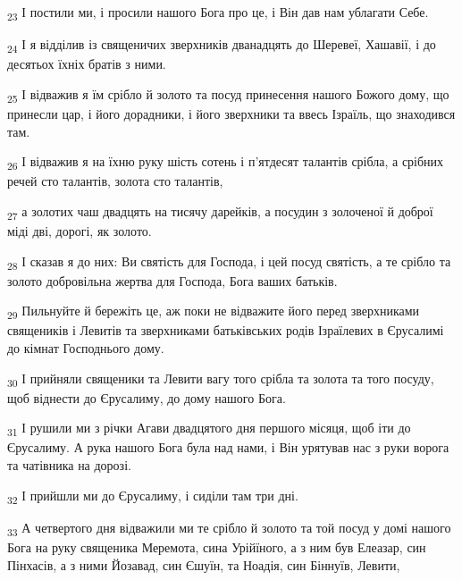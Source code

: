 \begin{tcolorbox}
\textsubscript{23} І постили ми, і просили нашого Бога про це, і Він дав нам ублагати Себе.
\end{tcolorbox}
\begin{tcolorbox}
\textsubscript{24} І я відділив із священичих зверхників дванадцять до Шеревеї, Хашавії, і до десятьох їхніх братів з ними.
\end{tcolorbox}
\begin{tcolorbox}
\textsubscript{25} І відважив я їм срібло й золото та посуд принесення нашого Божого дому, що принесли цар, і його дорадники, і його зверхники та ввесь Ізраїль, що знаходився там.
\end{tcolorbox}
\begin{tcolorbox}
\textsubscript{26} І відважив я на їхню руку шість сотень і п'ятдесят талантів срібла, а срібних речей сто талантів, золота сто талантів,
\end{tcolorbox}
\begin{tcolorbox}
\textsubscript{27} а золотих чаш двадцять на тисячу дарейків, а посудин з золоченої й доброї міді дві, дорогі, як золото.
\end{tcolorbox}
\begin{tcolorbox}
\textsubscript{28} І сказав я до них: Ви святість для Господа, і цей посуд святість, а те срібло та золото добровільна жертва для Господа, Бога ваших батьків.
\end{tcolorbox}
\begin{tcolorbox}
\textsubscript{29} Пильнуйте й бережіть це, аж поки не відважите його перед зверхниками священиків і Левитів та зверхниками батьківських родів Ізраїлевих в Єрусалимі до кімнат Господнього дому.
\end{tcolorbox}
\begin{tcolorbox}
\textsubscript{30} І прийняли священики та Левити вагу того срібла та золота та того посуду, щоб віднести до Єрусалиму, до дому нашого Бога.
\end{tcolorbox}
\begin{tcolorbox}
\textsubscript{31} І рушили ми з річки Агави двадцятого дня першого місяця, щоб іти до Єрусалиму. А рука нашого Бога була над нами, і Він урятував нас з руки ворога та чатівника на дорозі.
\end{tcolorbox}
\begin{tcolorbox}
\textsubscript{32} І прийшли ми до Єрусалиму, і сиділи там три дні.
\end{tcolorbox}
\begin{tcolorbox}
\textsubscript{33} А четвертого дня відважили ми те срібло й золото та той посуд у домі нашого Бога на руку священика Меремота, сина Урійїного, а з ним був Елеазар, син Пінхасів, а з ними Йозавад, син Єшуїн, та Ноадія, син Біннуїв, Левити,
\end{tcolorbox}
